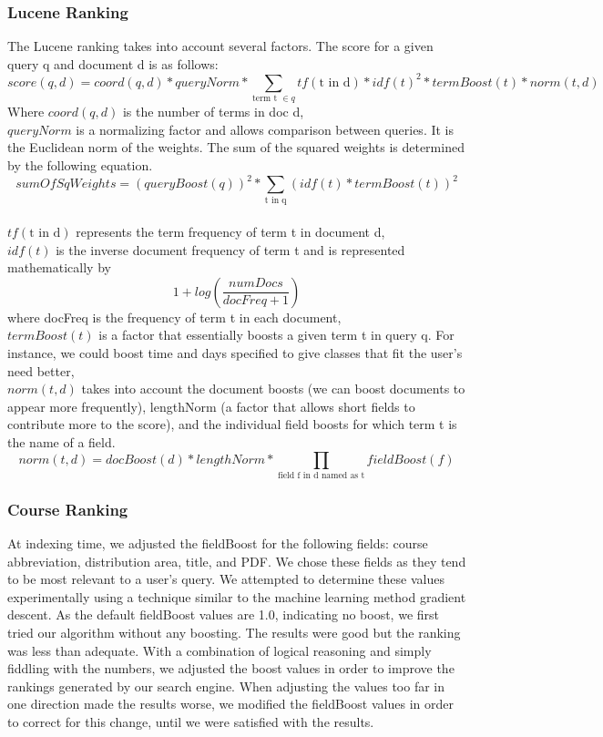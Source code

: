 \documentclass[12pt,letterpaper]{article}
\begin{document}
\subsubsection{Lucene Ranking}
The Lucene ranking takes into account several factors. The score for a given query q and document d is as follows:
\begin{equation*}
  score(q,d) = coord(q,d) * queryNorm * \sum_{\text{term t } \in q}{tf(\text{t in d}) * idf(t)^2 * termBoost(t) * norm(t,d)}
  \label{eq:practical}
\end{equation*}
Where $coord(q,d)$ is the number of terms in doc d,\\
$queryNorm$ is a normalizing factor and allows comparison between queries. It is the Euclidean norm of the weights. The sum of the squared weights is determined by the following equation. \[ sumOfSqWeights = (queryBoost(q))^2 * \sum_{\text{t in q}}{(idf(t) * termBoost(t))^2}\]\\
$tf(\text{t in d})$ represents the term frequency of term t in document d, \\
$idf(t)$ is the inverse document frequency of term t and is represented mathematically by \[ 1 + log(\frac{numDocs}{docFreq + 1}) \] where docFreq is the frequency of term t in each document, \\
$termBoost(t)$ is a factor that essentially boosts a given term t in query q. For instance, we could boost time and days specified to give classes that fit the user's need better,\\
$norm(t, d)$ takes into account the document boosts (we can boost documents to appear more frequently), lengthNorm (a factor that allows short fields to contribute more to the score), and the individual field boosts for which term t is the name of a field. 
\[ norm(t,d) = docBoost(d) * lengthNorm * \prod_{\text{field f in d named as t}}{fieldBoost(f)} \] 				

\subsubsection{Course Ranking}
At indexing time, we adjusted the fieldBoost for the following fields: course abbreviation, distribution area, title, and PDF. We chose these fields as they tend to be most relevant to a user's query. We attempted to determine these values experimentally using a technique similar to the machine learning method gradient descent. As the default fieldBoost values are 1.0, indicating no boost, we first tried our algorithm without any boosting. The results were good but the ranking was less than adequate.
With a combination of logical reasoning and simply fiddling with the numbers, we adjusted the boost values in order to improve the rankings generated by our search engine. When adjusting the values too far in one direction made the results worse, we modified the fieldBoost values in order to correct for this change, until we were satisfied with the results.
\end{document}
